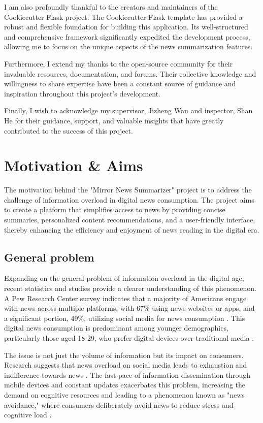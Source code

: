 \documentclass[10pt]{article}
\begin{document}
I am also profoundly thankful to the creators and maintainers of the Cookiecutter Flask project. The Cookiecutter Flask template has provided a robust and flexible foundation for building this application. Its well-structured and comprehensive framework significantly expedited the development process, allowing me to focus on the unique aspects of the news summarization features.

Furthermore, I extend my thanks to the open-source community for their invaluable resources, documentation, and forums. Their collective knowledge and willingness to share expertise have been a constant source of guidance and inspiration throughout this project's development.

Finally, I wish to acknowledge my supervisor, Jizheng Wan and inspector, Shan He for their guidance, support, and valuable insights that have greatly contributed to the success of this project.

\section{Motivation \& Aims}
The motivation behind the "Mirror News Summarizer" project is to address the challenge of information overload in digital news consumption. The project aims to create a platform that simplifies access to news by providing concise summaries, personalized content recommendations, and a user-friendly interface, thereby enhancing the efficiency and enjoyment of news reading in the digital era.

\subsection{General problem}
Expanding on the general problem of information overload in the digital age, recent statistics and studies provide a clearer understanding of this phenomenon. A Pew Research Center survey indicates that a majority of Americans engage with news across multiple platforms, with 67\% using news websites or apps, and a significant portion, 49\%, utilizing social media for news consumption \cite{pewnewsplatforms} . This digital news consumption is predominant among younger demographics, particularly those aged 18-29, who prefer digital devices over traditional media \cite{pewnewsplatforms} .

The issue is not just the volume of information but its impact on consumers. Research suggests that news overload on social media leads to exhaustion and indifference towards news \cite{frontiersinpsych2022} . The fast pace of information dissemination through mobile devices and constant updates exacerbates this problem, increasing the demand on cognitive resources and leading to a phenomenon known as "news avoidance," where consumers deliberately avoid news to reduce stress and cognitive load \cite{frontiersinpsych2022} .
\end{document}
